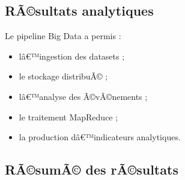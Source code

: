 ﻿\documentclass[12pt,a4paper]{report}
\begin{document}
\subsection{RÃ©sultats analytiques}

Le pipeline Big Data a permis :
\begin{itemize}
    \item lâ€™ingestion des datasets ;
    \item le stockage distribuÃ© ;
    \item lâ€™analyse des Ã©vÃ©nements ;
    \item le traitement MapReduce ;
    \item la production dâ€™indicateurs analytiques.
\end{itemize}

\subsection{RÃ©sumÃ© des rÃ©sultats}
\end{document}
